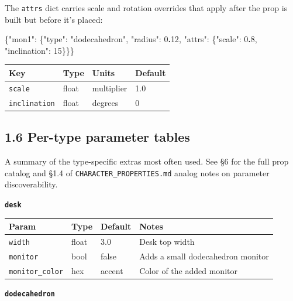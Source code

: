 \documentclass[
  11pt,
]{book}
\newenvironment{Shaded}{}{}
\newcommand{\DataTypeTok}[1]{\textcolor[rgb]{0.56,0.13,0.00}{#1}}
\newcommand{\DecValTok}[1]{\textcolor[rgb]{0.25,0.63,0.44}{#1}}
\newcommand{\ErrorTok}[1]{\textcolor[rgb]{1.00,0.00,0.00}{\textbf{#1}}}
\newcommand{\FunctionTok}[1]{\textcolor[rgb]{0.02,0.16,0.49}{#1}}
\newcommand{\StringTok}[1]{\textcolor[rgb]{0.25,0.44,0.63}{#1}}
\begin{document}
The \texttt{attrs} dict carries scale and rotation overrides that apply
after the prop is built but before it's placed:

\begin{Shaded}
\begin{Highlighting}[]
\FunctionTok{\{}\DataTypeTok{"mon1"}\FunctionTok{:} \FunctionTok{\{}\DataTypeTok{"type"}\FunctionTok{:} \StringTok{"dodecahedron"}\FunctionTok{,} \DataTypeTok{"radius"}\FunctionTok{:} \DecValTok{0}\ErrorTok{.}\DecValTok{12}\FunctionTok{,}
          \DataTypeTok{"attrs"}\FunctionTok{:} \FunctionTok{\{}\DataTypeTok{"scale"}\FunctionTok{:} \DecValTok{0}\ErrorTok{.}\DecValTok{8}\FunctionTok{,} \DataTypeTok{"inclination"}\FunctionTok{:} \DecValTok{15}\FunctionTok{\}\}\}}
\end{Highlighting}
\end{Shaded}

\begin{longtable}[]{@{}llll@{}}
\toprule\noalign{}
Key & Type & Units & Default \\
\midrule\noalign{}
\endhead
\bottomrule\noalign{}
\endlastfoot
\texttt{scale} & float & multiplier & 1.0 \\
\texttt{inclination} & float & degrees & 0 \\
\end{longtable}

\subsection{1.6 Per-type parameter
tables}\label{per-type-parameter-tables}

A summary of the type-specific extras most often used. See §6 for the
full prop catalog and §1.4 of \texttt{CHARACTER\_PROPERTIES.md} analog
notes on parameter discoverability.

\textbf{\texttt{desk}}

\begin{longtable}[]{@{}llll@{}}
\toprule\noalign{}
Param & Type & Default & Notes \\
\midrule\noalign{}
\endhead
\bottomrule\noalign{}
\endlastfoot
\texttt{width} & float & 3.0 & Desk top width \\
\texttt{monitor} & bool & false & Adds a small dodecahedron monitor \\
\texttt{monitor\_color} & hex & accent & Color of the added monitor \\
\end{longtable}

\textbf{\texttt{dodecahedron}}
\end{document}
